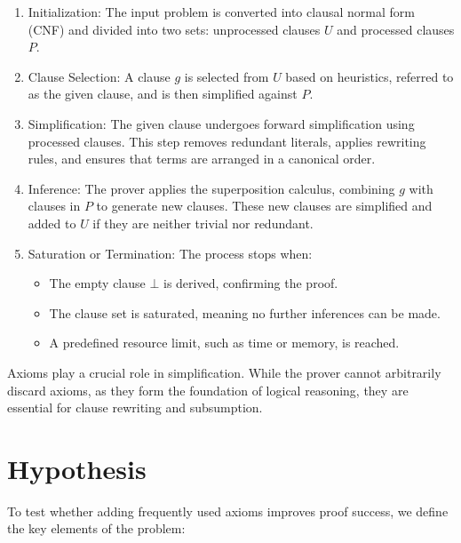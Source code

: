 \documentclass[english,version-2020-11]{uzl-thesis}
\begin{document}
\begin{enumerate}
    \item Initialization: The input problem is converted into clausal normal form (CNF) and divided into two sets: unprocessed clauses \( U \) and processed clauses \( P \).
    \item Clause Selection: A clause \( g \) is selected from \( U \) based on heuristics, referred to as the given clause, and is then simplified against \( P \).
    \item Simplification: The given clause undergoes forward simplification using processed clauses. This step removes redundant literals, applies rewriting rules, and ensures that terms are arranged in a canonical order.
    \item Inference: The prover applies the superposition calculus, combining \( g \) with clauses in \( P \) to generate new clauses. These new clauses are simplified and added to \( U \) if they are neither trivial nor redundant.
    \item Saturation or Termination: The process stops when:
    \begin{itemize}
        \item The empty clause \( \bot \) is derived, confirming the proof.
        \item The clause set is saturated, meaning no further inferences can be made.
        \item A predefined resource limit, such as time or memory, is reached.
    \end{itemize}
\end{enumerate}

Axioms play a crucial role in simplification. While the prover cannot arbitrarily discard axioms, as they form the foundation of logical reasoning, they are essential for clause rewriting and subsumption.


\section{Hypothesis}

To test whether adding frequently used axioms improves proof success, we define the key elements of the problem:
\end{document}
